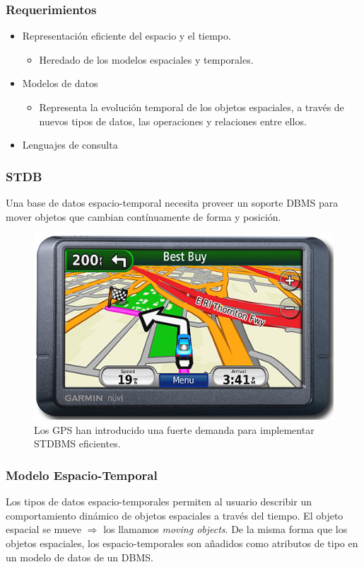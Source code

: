\documentclass[a4paper,12pt,oneside]{report}
\begin{document}
\subsubsection*{Requerimientos}
\begin{itemize}
\item Representaci\'on eficiente del espacio y el tiempo.
\begin{itemize}
\item Heredado de los modelos espaciales y temporales.
\end{itemize}
\item Modelos de datos
\begin{itemize}
\item Representa la evoluci\'on temporal de los objetos espaciales, a trav\'es de nuevos tipos de datos, las operaciones y relaciones entre ellos.
\end{itemize}
\item Lenguajes de consulta

\end{itemize}

\subsubsection*{STDB}
Una base de datos espacio-temporal necesita proveer un soporte DBMS para mover objetos que cambian cont\'inuamente de forma y posici\'on.
\begin{figure}[h]
\centering
\includegraphics[scale=0.3]{images/figure2.png}
\caption{Los GPS han introducido una fuerte demanda para implementar STDBMS eficientes.}
\end{figure}

\subsubsection*{Modelo Espacio-Temporal}
Los tipos de datos espacio-temporales permiten al usuario describir un comportamiento din\'amico de objetos espaciales a trav\'es del tiempo.
El objeto espacial se mueve $\Rightarrow$ los llamamos \textit{moving objects}.
De la misma forma que los objetos espaciales, los espacio-temporales son a\~nadidos como atributos de tipo en un modelo de datos de un DBMS.
\end{document}
